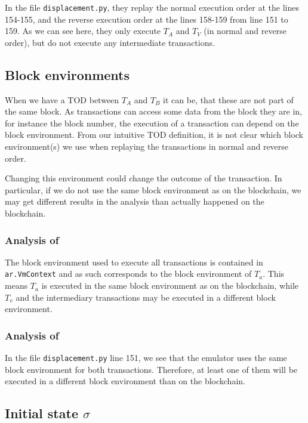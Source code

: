 \documentclass[draft,final]{vutinfth} %
\begin{document}
In the file \verb|displacement.py|, they replay the normal execution order at the lines 154-155, and the reverse execution order at the lines 158-159 from line 151 to 159. As we can see here, they only execute $T_A$ and $T_V$ (in normal and reverse order), but do not execute any intermediate transactions.

\subsection{Block environments}

When we have a TOD between $T_A$ and $T_B$ it can be, that these are not part of the same block. As transactions can access some data from the block they are in, for instance the block number, the execution of a transaction can depend on the block environment. From our intuitive TOD definition, it is not clear which block environment(s) we use when replaying the transactions in normal and reverse order.

Changing this environment could change the outcome of the transaction. In particular, if we do not use the same block environment as on the blockchain, we may get different results in the analysis than actually happened on the blockchain.

\subsubsection{Analysis of \cite{zhang_combatting_2023}}

The block environment used to execute all transactions is contained in \verb|ar.VmContext| and as such corresponds to the block environment of $T_a$. This means $T_a$ is executed in the same block environment as on the blockchain, while $T_v$ and the intermediary transactions may be executed in a different block environment.

\subsubsection{Analysis of \cite{torres_frontrunner_2021}}

In the file \verb|displacement.py| line 151, we see that the emulator uses the same block environment for both transactions. Therefore, at least one of them will be executed in a different block environment than on the blockchain.

\subsection{Initial state $\sigma$}
\end{document}
